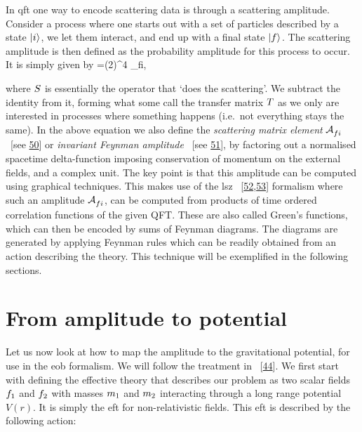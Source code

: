 \documentclass[
  10pt,
  a4paper,
  DIV=11,
  numbers=noendperiod,
  twoside]{scrreprt}
\let\[\relax \let\]\relax %
\DeclareRobustCommand{\[}{\begin{equation}}
\DeclareRobustCommand{\]}{\end{equation}}
\begin{document}
In \gls{qft} one way to encode scattering data is through a scattering
amplitude. Consider a process where one starts out with a set of
particles described by a state \(\ket{i}\), we let them interact, and
end up with a final state \(\ket{f}\). The scattering amplitude is then
defined as the probability amplitude for this process to occur. It is
simply given by
\[=(2\pi)^4 \im \ampl_{fi},\]

where \(\Smat\) is essentially the operator that `does the scattering'.
We subtract the identity from it, forming what some call the transfer
matrix \(\Tmat\) as we only are interested in processes where something
happens (i.e.~not everything stays the same). In the above equation we
also define the \emph{scattering matrix element} \(\ampl_{fi}\) ~{[}see
\protect\hyperlink{ref-Srednicki:2007}{50}{]} or \emph{invariant Feynman
amplitude} ~{[}see \protect\hyperlink{ref-Coleman:2018a}{51}{]}, by
factoring out a normalised spacetime delta-function imposing
conservation of momentum on the external fields, and a complex unit. The
key point is that this amplitude can be computed using graphical
techniques. This makes use of the \gls{lsz}
~{[}\protect\hyperlink{ref-Lehmann:1954rq}{52},\protect\hyperlink{ref-Collins:2019ozc}{53}{]}
formalism where such an amplitude \(\ampl_{fi}\), can be computed from
products of time ordered correlation functions of the given QFT. These
are also called Green's functions, which can then be encoded by sums of
Feynman diagrams. The diagrams are generated by applying Feynman rules
which can be readily obtained from an action describing the theory. This
technique will be exemplified in the following sections.

\hypertarget{sec-amp2pot}{%
\section{From amplitude to potential}\label{sec-amp2pot}}

Let us now look at how to map the amplitude to the gravitational
potential, for use in the \gls{eob} formalism. We will follow the
treatment in ~{[}\protect\hyperlink{ref-Cheung:2018wkq}{44}{]}. We first
start with defining the effective theory that describes our problem as
two scalar fields \(\wf[1]\) and \(\wf[2]\) with masses \(\mass[1]\) and
\(\mass[2]\) interacting through a long range potential \(V(r)\). It is
simply the \gls{eft} for non-relativistic fields. This \gls{eft} is
described by the following action:
\end{document}
